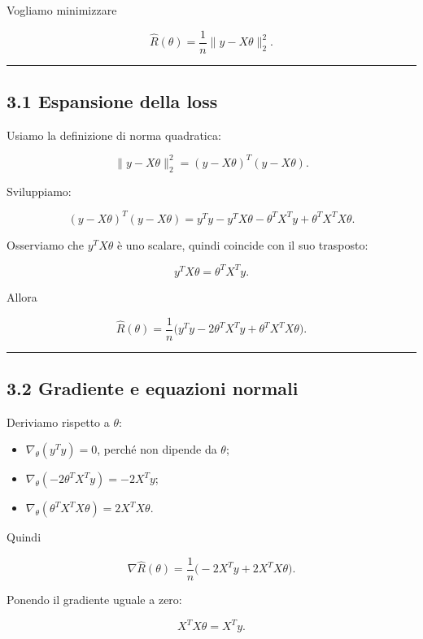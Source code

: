 \documentclass[
]{article}
\providecommand{\tightlist}{%
  \setlength{\itemsep}{0pt}\setlength{\parskip}{0pt}}
\begin{document}
Vogliamo minimizzare

\[
\hat R(\theta)=\frac{1}{n}\|y-X\theta\|_2^2.
\]

\begin{center}\rule{0.5\linewidth}{0.5pt}\end{center}

\subsection{3.1 Espansione della loss}\label{espansione-della-loss}

Usiamo la definizione di norma quadratica:

\[
\|y-X\theta\|_2^2 = (y-X\theta)^T(y-X\theta).
\]

Sviluppiamo:

\[
(y-X\theta)^T(y-X\theta)
=
y^Ty - y^TX\theta - \theta^TX^Ty + \theta^TX^TX\theta.
\]

Osserviamo che \(y^TX\theta\) è uno scalare, quindi coincide con il suo
trasposto:

\[
y^TX\theta = \theta^TX^Ty.
\]

Allora

\[
\hat R(\theta)=\frac{1}{n}\big(y^Ty - 2\theta^TX^Ty + \theta^TX^TX\theta\big).
\]

\begin{center}\rule{0.5\linewidth}{0.5pt}\end{center}

\subsection{3.2 Gradiente e equazioni
normali}\label{gradiente-e-equazioni-normali}

Deriviamo rispetto a \(\theta\):

\begin{itemize}
\tightlist
\item
  \(\nabla_\theta(y^Ty)=0\), perché non dipende da \(\theta\);
\item
  \(\nabla_\theta(-2\theta^TX^Ty)=-2X^Ty\);
\item
  \(\nabla_\theta(\theta^TX^TX\theta)=2X^TX\theta\).
\end{itemize}

Quindi

\[
\nabla \hat R(\theta)=\frac{1}{n}\big(-2X^Ty+2X^TX\theta\big).
\]

Ponendo il gradiente uguale a zero:

\[
X^TX\theta=X^Ty.
\]
\end{document}
